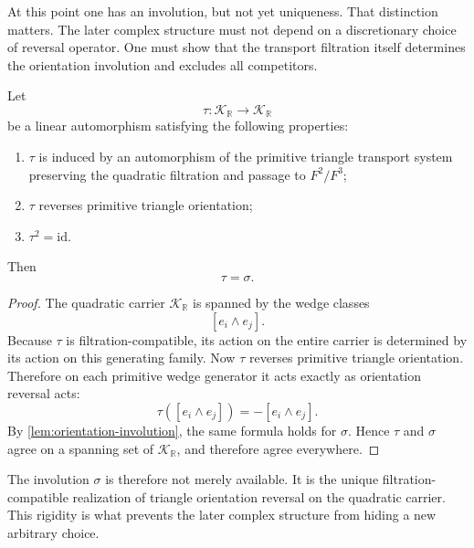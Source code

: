 At this point one has an involution, but not yet uniqueness.
That distinction matters.
The later complex structure must not depend on a discretionary choice of
reversal operator.
One must show that the transport filtration itself determines the
orientation involution and excludes all competitors.
\begin{lemma}
	\label{lem:orientation-unique}
	Let
	\[
		\tau:\mathcal K_{\mathbb R}\to\mathcal K_{\mathbb R}
	\]
	be a linear automorphism satisfying the following properties:
	\begin{enumerate}[label=\textup{(\roman*)}]
		\item
		      \(\tau\) is induced by an automorphism of the primitive triangle
		      transport system preserving the quadratic filtration and passage to
		      \(F^{2}/F^{3}\);
		\item
		      \(\tau\) reverses primitive triangle orientation;
		\item
		      \(\tau^{2}=\mathrm{id}\).
	\end{enumerate}
	Then
	\[
		\tau=\sigma.
	\]
\end{lemma}
\begin{proof}
	The quadratic carrier \(\mathcal K_{\mathbb R}\) is spanned by the wedge
	classes
	\[
		[e_i\wedge e_j].
	\]
	Because \(\tau\) is filtration-compatible, its action on the entire
	carrier is determined by its action on this generating family.
	Now \(\tau\) reverses primitive triangle orientation.
	Therefore on each primitive wedge generator it acts exactly as
	orientation reversal acts:
	\[
		\tau([e_i\wedge e_j])=-[e_i\wedge e_j].
	\]
	By \cref{lem:orientation-involution}, the same formula holds for
	\(\sigma\).
	Hence \(\tau\) and \(\sigma\) agree on a spanning set of
	\(\mathcal K_{\mathbb R}\), and therefore agree everywhere.
\end{proof}
\begin{remark}
	The involution \(\sigma\) is therefore not merely available.
	It is the unique filtration-compatible realization of triangle
	orientation reversal on the quadratic carrier.
	This rigidity is what prevents the later complex structure from hiding a
	new arbitrary choice.
\end{remark}
